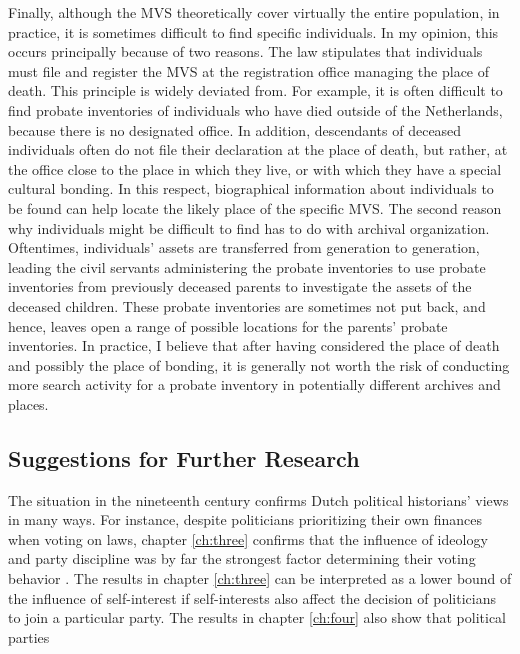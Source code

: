 Finally, although the MVS theoretically cover virtually the entire population, in practice, it is sometimes difficult to find specific individuals. In my opinion, this occurs principally because of two reasons. The law stipulates that individuals must file and register the MVS at the registration office managing the place of death. This principle is widely deviated from. For example, it is often difficult to find probate inventories of individuals who have died outside of the Netherlands, because there is no designated office. In addition, descendants of deceased individuals often do not file their declaration at the place of death, but rather, at the office close to the place in which they live, or with which they have a special cultural bonding. In this respect, biographical information about individuals to be found can help locate the likely place of the specific MVS. The second reason why individuals might be difficult to find has to do with archival organization. Oftentimes, individuals' assets are transferred from generation to generation, leading the civil servants administering the probate inventories to use probate inventories from previously deceased parents to investigate the assets of the deceased children. These probate inventories are sometimes not put back, and hence, leaves open a range of possible locations for the parents' probate inventories. In practice, I believe that after having considered the place of death and possibly the place of bonding, it is generally not worth the risk of conducting more search activity for a probate inventory in potentially different archives and places.  





\subsection{Suggestions for Further Research}\label{sec:sfr}

The situation in the nineteenth century confirms Dutch political historians' views in many ways. For instance, despite politicians prioritizing their own finances when voting on laws, chapter \ref{ch:three} confirms that the influence of ideology and party discipline was by far the strongest factor determining their voting behavior \citep[see e.g.][]{de2003het, de2014ons}. The results in chapter \ref{ch:three} can be interpreted as a lower bound of the influence of self-interest if self-interests also affect the decision of politicians to join a particular party.  The results in chapter \ref{ch:four} also show that political parties 

